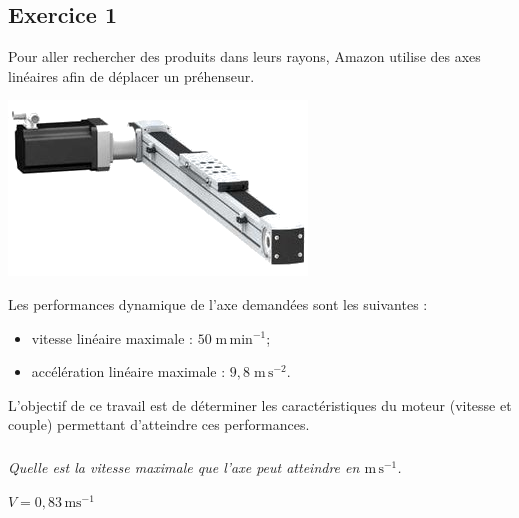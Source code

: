 \documentclass[10pt,fleqn]{book} %
\begin{document}

\vspace{8cm}
\pagestyle{fancy}
\thispagestyle{plain}


\def\columnseprulecolor{\color{ocre}}
\setlength{\columnseprule}{0.4pt} 
\begin{multicols}{2}

\section*{Exercice 1}

Pour aller rechercher des produits dans leurs rayons, Amazon utilise des axes linéaires afin de déplacer un préhenseur.
\begin{center}
\includegraphics[width=\linewidth]{images/fig_01}
\end{center}

Les performances dynamique de l'axe demandées sont les suivantes : 
\begin{itemize}
\item vitesse linéaire maximale : $50 \; \text{m}\,\text{min}^{-1}$;
\item accélération linéaire maximale : $9,8 \; \text{m}\, \text{s}^{-2}$.
\end{itemize}

\begin{obj}
L'objectif de ce travail est de déterminer les caractéristiques du moteur (vitesse et couple) permettant d'atteindre ces performances.
\end{obj}

\subparagraph{}
\textit{Quelle est la vitesse maximale que l'axe peut atteindre en  $\text{m}\, \text{s}^{-1}$.}
\ifprof
\begin{corrige}
$V = 0,83 \, \text{ms}^{-1}$
\end{corrige}
\else
\fi


\end{multicols}
\end{document}
